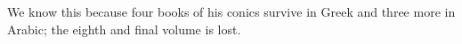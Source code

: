 

We know this because four books of his conics survive in Greek and three more in Arabic; the eighth and final volume is lost. 

%


